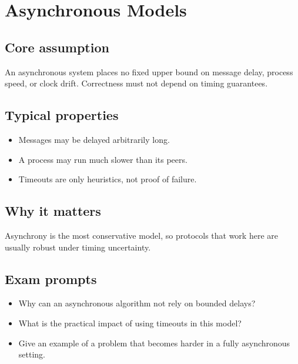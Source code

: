 \chapter{Asynchronous Models}

\section{Core assumption}
\begin{defbox}
An asynchronous system places no fixed upper bound on message delay, process speed, or clock drift. Correctness must not depend on timing guarantees.
\end{defbox}

\section{Typical properties}
\begin{itemize}
  \item Messages may be delayed arbitrarily long.
  \item A process may run much slower than its peers.
  \item Timeouts are only heuristics, not proof of failure.
\end{itemize}

\section{Why it matters}
\begin{keybox}
Asynchrony is the most conservative model, so protocols that work here are usually robust under timing uncertainty.
\end{keybox}

\section{Exam prompts}
\begin{itemize}
  \item Why can an asynchronous algorithm not rely on bounded delays?
  \item What is the practical impact of using timeouts in this model?
  \item Give an example of a problem that becomes harder in a fully asynchronous setting.
\end{itemize}
